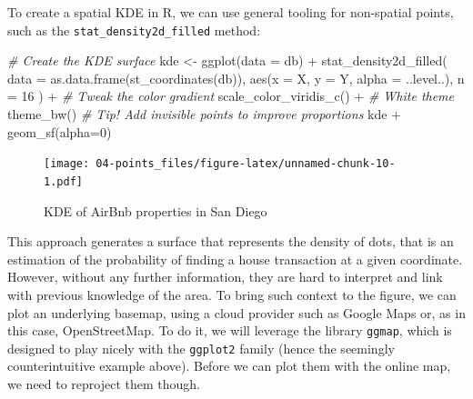 \documentclass[
]{book}
\newenvironment{Shaded}{\begin{snugshade}}{\end{snugshade}}
\newcommand{\AttributeTok}[1]{\textcolor[rgb]{0.77,0.63,0.00}{#1}}
\newcommand{\CommentTok}[1]{\textcolor[rgb]{0.56,0.35,0.01}{\textit{#1}}}
\newcommand{\DecValTok}[1]{\textcolor[rgb]{0.00,0.00,0.81}{#1}}
\newcommand{\FunctionTok}[1]{\textcolor[rgb]{0.00,0.00,0.00}{#1}}
\newcommand{\NormalTok}[1]{#1}
\newcommand{\OtherTok}[1]{\textcolor[rgb]{0.56,0.35,0.01}{#1}}
\newcommand{\SpecialCharTok}[1]{\textcolor[rgb]{0.00,0.00,0.00}{#1}}
\begin{document}
To create a spatial KDE in R, we can use general tooling for non-spatial points, such as the \texttt{stat\_density2d\_filled} method:

\begin{Shaded}
\begin{Highlighting}[]
\CommentTok{\# Create the KDE surface}
\NormalTok{kde }\OtherTok{\textless{}{-}} \FunctionTok{ggplot}\NormalTok{(}\AttributeTok{data =}\NormalTok{ db) }\SpecialCharTok{+}
  \FunctionTok{stat\_density2d\_filled}\NormalTok{(}
    \AttributeTok{data =} \FunctionTok{as.data.frame}\NormalTok{(}\FunctionTok{st\_coordinates}\NormalTok{(db)), }
    \FunctionTok{aes}\NormalTok{(}\AttributeTok{x =}\NormalTok{ X, }\AttributeTok{y =}\NormalTok{ Y, }\AttributeTok{alpha =}\NormalTok{ ..level..),}
    \AttributeTok{n =} \DecValTok{16}
\NormalTok{  ) }\SpecialCharTok{+}
  \CommentTok{\# Tweak the color gradient}
  \FunctionTok{scale\_color\_viridis\_c}\NormalTok{() }\SpecialCharTok{+}
  \CommentTok{\# White theme}
  \FunctionTok{theme\_bw}\NormalTok{()}
\CommentTok{\# Tip! Add invisible points to improve proportions}
\NormalTok{kde }\SpecialCharTok{+} \FunctionTok{geom\_sf}\NormalTok{(}\AttributeTok{alpha=}\DecValTok{0}\NormalTok{)}
\end{Highlighting}
\end{Shaded}

\begin{figure}
\centering
\texttt{[image: 04-points\_files/figure-latex/unnamed-chunk-10-1.pdf]}
\caption{\label{fig:unnamed-chunk-10}KDE of AirBnb properties in San Diego}
\end{figure}

This approach generates a surface that represents the density of dots, that is an estimation of the probability of finding a house transaction at a given coordinate. However, without any further information, they are hard to interpret and link with previous knowledge of the area. To bring such context to the figure, we can plot an underlying basemap, using a cloud provider such as Google Maps or, as in this case, OpenStreetMap. To do it, we will leverage the library \texttt{ggmap}, which is designed to play nicely with the \texttt{ggplot2} family (hence the seemingly counterintuitive example above). Before we can plot them with the online map, we need to reproject them though.
\end{document}
